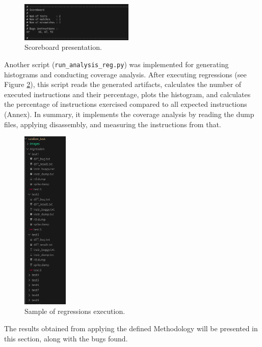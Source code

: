 \begin{figure}[H]
    \centering
    \includegraphics[width=0.48\textwidth]{./c3l1_img/scb.png}
    \caption{Scoreboard presentation.}
    \label{fig:scb}
\end{figure}

Another script (\texttt{run\_analysis\_reg.py}) was implemented for generating histograms and conducting coverage analysis. After executing regressions (see Figure \ref{fig:regressions_sample}), this script reads the generated artifacts, calculates the number of executed instructions and their percentage, plots the histogram, and calculates the percentage of instructions exercised compared to all expected instructions (Annex). In summary, it implements the coverage analysis by reading the dump files, applying disassembly, and measuring the instructions from that.

\begin{figure}[H]
    \centering
    \includegraphics[width=0.19\textwidth]{./c3l1_img/regressions_sample.png}
    \caption{Sample of regressions execution.}
    \label{fig:regressions_sample}
\end{figure}

The results obtained from applying the defined Methodology will be presented in this section, along with the bugs found. 

